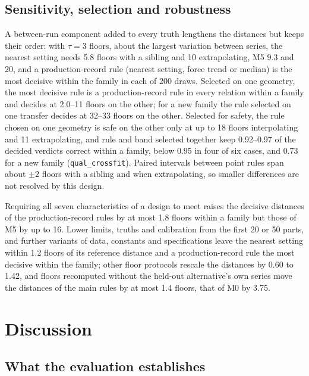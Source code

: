 \documentclass[pdflatex,sn-basic,lineno]{sn-jnl}
\newcommand{\res}[1]{\texttt{#1}}  %
\begin{document}
\subsection{Sensitivity, selection and robustness}\label{sec:res-robust}

A between-run component added to every truth lengthens the distances but keeps their order: with $\tau=3$ floors, about the largest variation between series, the nearest setting needs 5.8 floors with a sibling and 10 extrapolating, M5 9.3 and 20, and a production-record rule (nearest setting, force trend or median) is the most decisive within the family in each of 200 draws. Selected on one geometry, the most decisive rule is a production-record rule in every relation within a family and decides at 2.0--11 floors on the other; for a new family the rule selected on one transfer decides at 32--33 floors on the other. Selected for safety, the rule chosen on one geometry is safe on the other only at up to 18 floors interpolating and 11 extrapolating, and rule and band selected together keep 0.92--0.97 of the decided verdicts correct within a family, below 0.95 in four of six cases, and 0.73 for a new family (\res{qual\_crossfit}). Paired intervals between point rules span about $\pm2$ floors with a sibling and when extrapolating, so smaller differences are not resolved by this design.

Requiring all seven characteristics of a design to meet raises the decisive distances of the production-record rules by at most 1.8 floors within a family but those of M5 by up to 16. Lower limits, truths and calibration from the first 20 or 50 parts, and further variants of data, constants and specifications leave the nearest setting within 1.2 floors of its reference distance and a production-record rule the most decisive within the family; other floor protocols rescale the distances by 0.60 to 1.42, and floors recomputed without the held-out alternative's own series move the distances of the main rules by at most 1.4 floors, that of M0 by 3.75.

\section{Discussion}\label{sec:discussion}

\subsection{What the evaluation establishes}
\end{document}

